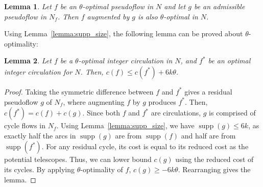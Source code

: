 \documentclass[11pt]{article}
\def\arcto{\mathord\shortrightarrow}
\def\arc#1#2{#1\arcto#2}
\def\cost{c}
\def\supp{\operatorname{supp}}
\newtheorem{lemma}{Lemma}[section]
\numberwithin{figure}{section}
\begin{document}
\begin{lemma}
\label{lemma:eps_opt_preserve}
Let $f$ be an $\theta$-optimal pseudoflow in $N$ and let $g$ be an admissible
pseudoflow in $N_f$.
Then $f$ augmented by $g$ is also $\theta$-optimal in $N$.
\end{lemma}

%

Using Lemma~\ref{lemma:supp_size}, the following lemma can be proved about
$\theta$-optimality:

\begin{lemma}
\label{lemma:goldberg_cost_add}
Let $f$ be a $\theta$-optimal integer circulation in $N$,
and $f^*$ be an optimal integer circulation for $N$.
Then, $\cost(f) \leq \cost(f^*) + 6k\theta$.
\end{lemma}
\begin{proof}
Taking the symmetric difference between $f$ and $f^*$ gives a residual pseudoflow $g$ of $N_f$,
where augmenting $f$ by $g$ produces $f^*$.
Then, $\cost(f^*) = \cost(f) + \cost(g)$.
Since both $f$ and $f^*$ are circulations, $g$ is comprised of cycle flows in $N_f$.
Using Lemma~\ref{lemma:supp_size}, we have $\supp(g) \leq 6k$, as exactly half
the arcs in $\supp(g)$ are from $\supp(f)$ and half are from $\supp(f^*)$.
For any residual cycle, its cost is equal to its reduced cost as the potential telescopes.
Thus, we can lower bound $\cost(g)$ using the reduced cost of its cycles.
By applying $\theta$-optimality of $f$, $\cost(g) \geq -6k\theta$.
Rearranging gives the lemma.
\end{proof}
\end{document}
